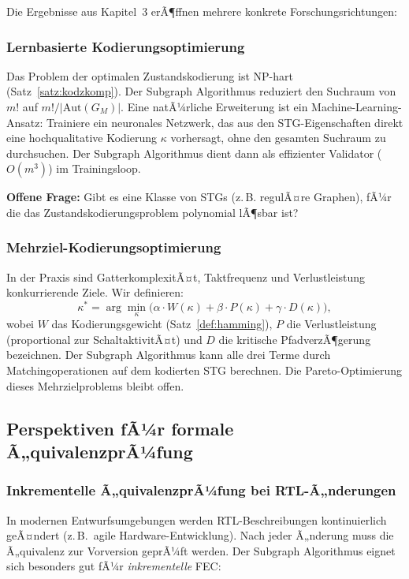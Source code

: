 ﻿\documentclass[a4paper,12pt]{article}
\theoremstyle{definition}
\begin{document}
Die Ergebnisse aus Kapitel~3 erÃ¶ffnen mehrere konkrete Forschungsrichtungen:

\subsubsection{Lernbasierte Kodierungsoptimierung}

Das Problem der optimalen Zustandskodierung ist NP-hart (Satz~\ref{satz:kodzkomp}).
Der Subgraph Algorithmus reduziert den Suchraum von $m!$ auf $m!/|\text{Aut}(G_M)|$.
Eine natÃ¼rliche Erweiterung ist ein Machine-Learning-Ansatz: Trainiere ein neuronales
Netzwerk, das aus den STG-Eigenschaften direkt eine hochqualitative Kodierung
$\kappa$ vorhersagt, ohne den gesamten Suchraum zu durchsuchen. Der Subgraph
Algorithmus dient dann als effizienter Validator ($O(m^3)$) im Trainingsloop.

\textbf{Offene Frage:} Gibt es eine Klasse von STGs (z.\,B. regulÃ¤re Graphen), fÃ¼r
die das Zustandskodierungsproblem polynomial lÃ¶sbar ist?

\subsubsection{Mehrziel-Kodierungsoptimierung}

In der Praxis sind GatterkomplexitÃ¤t, Taktfrequenz und Verlustleistung konkurrierende
Ziele. Wir definieren:
\[
  \kappa^* = \arg\min_\kappa \bigl(\alpha \cdot W(\kappa) + \beta \cdot P(\kappa)
  + \gamma \cdot D(\kappa)\bigr),
\]
wobei $W$ das Kodierungsgewicht (Satz~\ref{def:hamming}), $P$ die Verlustleistung
(proportional zur SchaltaktivitÃ¤t) und $D$ die kritische PfadverzÃ¶gerung bezeichnen.
Der Subgraph Algorithmus kann alle drei Terme durch Matchingoperationen auf dem
kodierten STG berechnen. Die Pareto-Optimierung dieses Mehrzielproblems bleibt offen.

\subsection{Perspektiven fÃ¼r formale Ã„quivalenzprÃ¼fung}

\subsubsection{Inkrementelle Ã„quivalenzprÃ¼fung bei RTL-Ã„nderungen}

In modernen Entwurfsumgebungen werden RTL-Beschreibungen kontinuierlich geÃ¤ndert
(z.\,B.\ agile Hardware-Entwicklung). Nach jeder Ã„nderung muss die Ã„quivalenz zur
Vorversion geprÃ¼ft werden. Der Subgraph Algorithmus eignet sich besonders gut fÃ¼r
\emph{inkrementelle} FEC:
\end{document}
